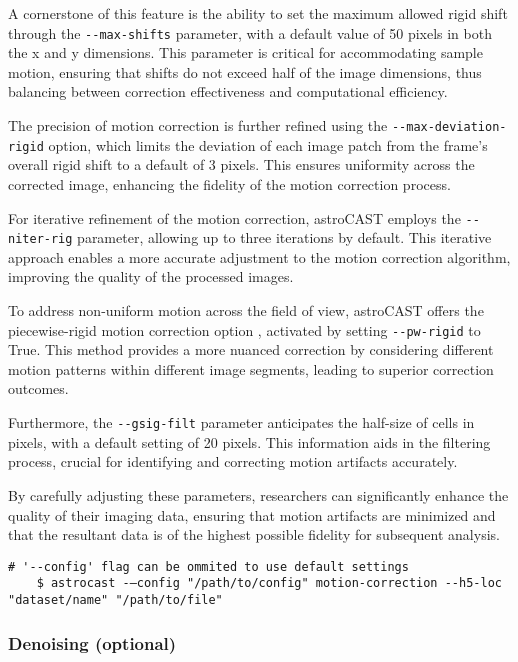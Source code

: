 A cornerstone of this feature is the ability to set the maximum allowed rigid shift through the \lstinline[style=
bashStyle]{--max-shifts} parameter, with a default value of 50 pixels in both the x and y dimensions. This parameter
is critical for accommodating sample motion, ensuring that shifts do not exceed half of the image dimensions, thus
balancing between correction effectiveness and computational efficiency.

The precision of motion correction is further refined using the \lstinline[style=bashStyle]{--max-deviation-rigid}
option, which limits the deviation of each image patch from the frame's overall rigid shift to a default of 3 pixels.
This ensures uniformity across the corrected image, enhancing the fidelity of the motion correction process.

For iterative refinement of the motion correction, astroCAST employs the \lstinline[style=bashStyle]{--niter-rig}
parameter, allowing up to three iterations by default. This iterative approach enables a more accurate adjustment to
the motion correction algorithm, improving the quality of the processed images.

To address non-uniform motion across the field of view, astroCAST offers the piecewise-rigid motion correction option
, activated by setting \lstinline[style=bashStyle]{--pw-rigid} to True. This method provides a more nuanced
correction by considering different motion patterns within different image segments, leading to superior correction
outcomes.

Furthermore, the \lstinline[style=bashStyle]{--gsig-filt} parameter anticipates the half-size of cells in pixels,
with a default setting of 20 pixels. This information aids in the filtering process, crucial for identifying and
correcting motion artifacts accurately.

By carefully adjusting these parameters, researchers can significantly enhance the quality of their imaging data,
ensuring that motion artifacts are minimized and that the resultant data is of the highest possible fidelity for
subsequent analysis.

\begin{lstlisting}[style=bashStyle]
    # '--config' flag can be ommited to use default settings
    $ astrocast -–config "/path/to/config" motion-correction --h5-loc "dataset/name" "/path/to/file"
\end{lstlisting}

\subsubsection{Denoising (optional)}

